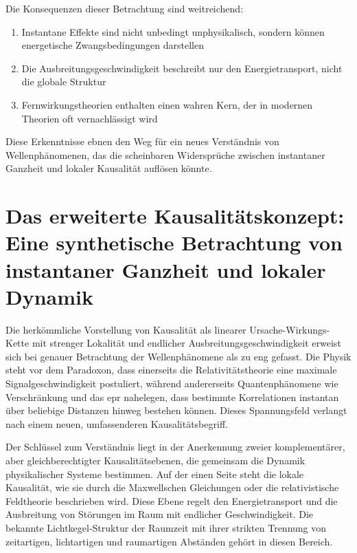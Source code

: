 Die Konsequenzen dieser Betrachtung sind weitreichend:
\begin{enumerate}
    \item Instantane Effekte sind nicht unbedingt unphysikalisch, sondern können energetische Zwangsbedingungen darstellen
    \item Die Ausbreitungsgeschwindigkeit beschreibt nur den Energietransport, nicht die globale Struktur
    \item Fernwirkungstheorien enthalten einen wahren Kern, der in modernen Theorien oft vernachlässigt wird
\end{enumerate}
Diese Erkenntnisse ebnen den Weg für ein neues Verständnis von Wellenphänomenen, das die scheinbaren Widersprüche zwischen instantaner Ganzheit und lokaler Kausalität auflösen könnte.

\section{Das erweiterte Kausalitätskonzept: Eine synthetische Betrachtung von instantaner Ganzheit und lokaler Dynamik}
Die herkömmliche Vorstellung von Kausalität als linearer Ursache-Wirkungs-Kette mit strenger Lokalität und endlicher Ausbreitungsgeschwindigkeit erweist sich bei genauer Betrachtung
der Wellenphänomene als zu eng gefasst. Die Physik steht vor dem Paradoxon, dass einerseits die Relativitätstheorie eine maximale Signalgeschwindigkeit postuliert, während andererseits
Quantenphänomene wie Verschränkung und das \gls{epr} \cite{EPR1935} nahelegen, dass bestimmte Korrelationen instantan über beliebige Distanzen hinweg bestehen können. Dieses Spannungsfeld verlangt
nach einem neuen, umfassenderen Kausalitätsbegriff.

Der Schlüssel zum Verständnis liegt in der Anerkennung zweier komplementärer, aber gleichberechtigter Kausalitätsebenen, die gemeinsam die Dynamik physikalischer Systeme bestimmen.
Auf der einen Seite steht die lokale Kausalität, wie sie durch die Maxwellschen Gleichungen oder die relativistische Feldtheorie beschrieben wird. Diese Ebene regelt den Energietransport
und die Ausbreitung von Störungen im Raum mit endlicher Geschwindigkeit. Die bekannte Lichtkegel-Struktur der Raumzeit mit ihrer strikten Trennung von zeitartigen, lichtartigen und
raumartigen Abständen gehört in diesen Bereich.

